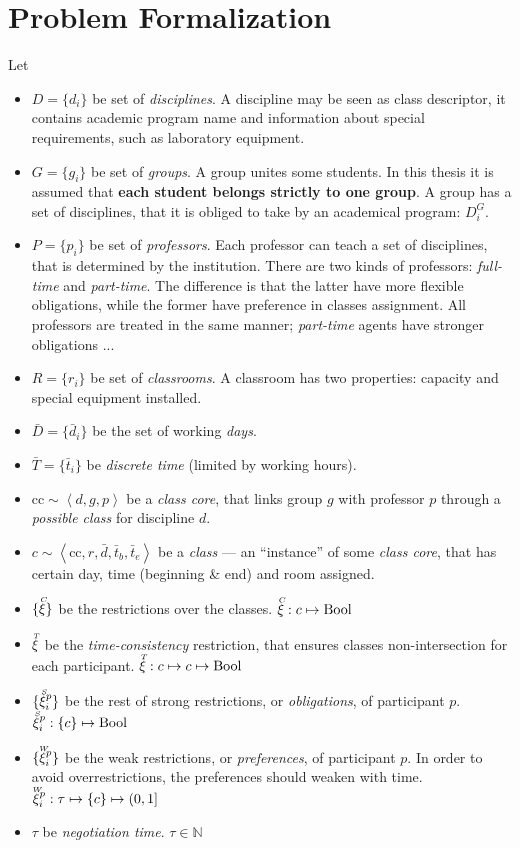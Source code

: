\documentclass[ThesisDoc]{subfiles}
\begin{document}



\section{Problem Formalization}
\label{sec:ProblemFormal}


Let \begin{itemize}
\item $D=\{d_i\}$ be set of \emph{disciplines}.
  A discipline may be seen as class descriptor, it contains
  academic program name and information about special requirements,
  such as laboratory equipment.
\item $G=\{g_i\}$ be set of \emph{groups}.
  A group unites some students. In this thesis it is assumed that
  \textbf{each student belongs strictly to one group}.
  A group has a set of disciplines, that it is obliged to take by an
  academical program: $D^G_i$.
\item $P=\{p_i\}$ be set of \emph{professors}.
  Each professor can teach a set of disciplines, that is determined
  by the institution. There are two kinds of professors:
  \emph{full-time} and \emph{part-time}. The difference is that the
  latter have more flexible obligations, while the former have preference
  in classes assignment. All professors are treated in the same manner;
  \emph{part-time} agents have stronger obligations ... \todo{}
\item $R=\{r_i\}$ be set of \emph{classrooms}.
  A classroom has two properties: capacity and special equipment installed.
\item $\bar D=\{\bar d_i\}$ be the set of working \emph{days}.
\item $\bar T=\{\bar t_i\}$ be \emph{discrete time} (limited by working hours).
\item $\mathrm{cc} \sim \left< d, g, p \right>$ be a \emph{class core}, that
      links group $g$ with professor $p$ through a \emph{possible class} for
      discipline $d$.
\item $ c \sim \left< \mathrm{cc}, r, \bar d, \bar t_b, \bar t_e \right> $
      be a \emph{class} --- an ``instance'' of some \emph{class core}, that has
      certain day, time (beginning \& end) and room assigned.
\item $\{\accentset{C}{\xi}\}$ be the restrictions over the classes.
      $\accentset{C}{\xi} : c \mapsto \mathrm{Bool}$
\item $\accentset{T}{\xi}$ be the \emph{time-consistency} restriction, that ensures
  classes non-intersection for each participant.
      $\accentset{T}{\xi} : c \mapsto c \mapsto \mathrm{Bool}$
\item $\{\accentset{S}{\xi}^p_i\}$ be the rest of strong restrictions, or \emph{obligations},
      of participant $p$.
      $\accentset{S}{\xi}^p_i : \{c\} \mapsto \mathrm{Bool}$
\item $\{\accentset{W}{\xi}^p_i\}$ be the weak restrictions, or \emph{preferences}, of participant $p$.
      In order to avoid overrestrictions, the preferences should weaken with time.
      $\accentset{W}{\xi}^p_i : \tau \mapsto \{c\} \mapsto (0,1]$
\item $\tau$ be \emph{negotiation time}. $\tau \in \mathbb{N}$
\end{itemize}
\medskip
\end{document}
